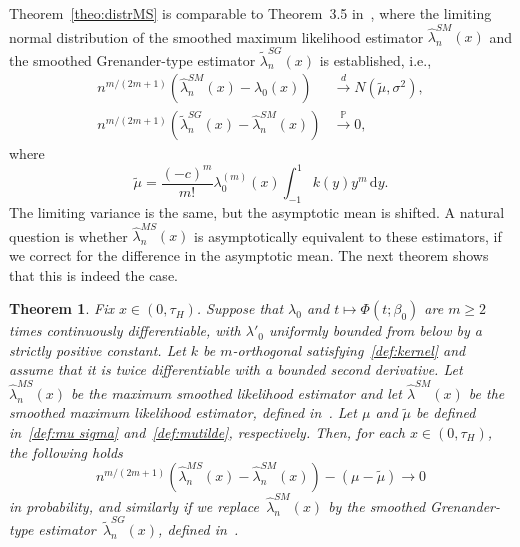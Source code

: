 \documentclass[11pt,reqno]{amsart}
\theoremstyle{definition}
\theoremstyle{plain}
\newtheorem{theo}[de]{Theorem}
\theoremstyle{remark}
\begin{document}
Theorem~\ref{theo:distrMS} is comparable to Theorem~3.5 in~\cite{LopuhaaMustaSI2016},
where the limiting normal distribution of the smoothed maximum likelihood estimator $\hat{\lambda}^{SM}_n(x)$
and the smoothed Grenander-type estimator $\tilde\lambda_n^{SG}(x)$ is established, i.e.,
\begin{equation}
\label{eq:asymp norm SM SG}
\begin{split}
n^{m/(2m+1)}
\left(\hat{\lambda}^{SM}_n(x)-\lambda_0(x)\right)
&\xrightarrow{d}
N(\widetilde{\mu},\sigma^2),\\
n^{m/(2m+1)}
\left(
\tilde\lambda_n^{SG}(x)-\hat{\lambda}^{SM}_n(x)
\right)
&\xrightarrow{\mathbb{P}} 0,
\end{split}
\end{equation}
where
\begin{equation}
\label{def:mutilde}
\widetilde{\mu}
=\frac{(-c)^m}{m!}
\lambda_0^{(m)}(x)
\int_{-1}^1 k(y)y^m\,\mathrm{d}y.
\end{equation}The limiting variance is the same, but the asymptotic mean is shifted.
A natural question is whether $\hat{\lambda}^{MS}_n(x)$ is asymptotically equivalent to these estimators,
if we correct for the difference in the asymptotic mean.
The next theorem shows that this is indeed the case.
\begin{theo}
\label{theo:MSLE asymptotic equivalence}
Fix $x\in(0,\tau_H)$.
Suppose that $\lambda_0$ and $t\mapsto\Phi(t;\beta_0)$ are $m\geq 2$ times continuously differentiable,
with $\lambda'_0$ uniformly bounded from below by a strictly positive constant.
Let $k$ be $m$-orthogonal satisfying~\eqref{def:kernel} and assume that it is twice differentiable with a bounded second derivative.
Let~$\hat{\lambda}^{MS}_n(x)$ be the maximum smoothed likelihood estimator and let
$\hat{\lambda}^{SM}(x)$ be the smoothed maximum likelihood estimator, defined in~\cite{LopuhaaMustaSI2016}.
Let $\mu$ and $\widetilde{\mu}$ be defined in~\eqref{def:mu sigma} and~\eqref{def:mutilde}, respectively.
Then, for each $x\in(0,\tau_H)$, the following holds
\[
n^{m/(2m+1)}
\left(
\hat\lambda_n^{MS}(x)
-
\hat\lambda_n^{SM}(x)
\right)
-
\left(
\mu-\widetilde{\mu}
\right)
\to
0
\]
in probability, and similarly if we replace~$\hat\lambda_n^{SM}(x)$
by the smoothed Grenander-type estimator~$\tilde\lambda_n^{SG}(x)$, defined in~\cite{LopuhaaMustaSI2016}.
\end{theo}
\end{document}
